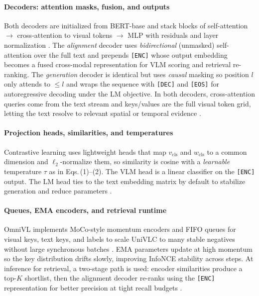 \begin{enrichment}
\begin{enrichment}
        \paragraph{Decoders: attention masks, fusion, and outputs}
        Both decoders are initialized from BERT-base and stack blocks of self-attention \(\rightarrow\) cross-attention to visual tokens \(\rightarrow\) MLP with residuals and layer normalization \cite{wang2022_omnivl}. The \emph{alignment} decoder uses \emph{bidirectional} (unmasked) self-attention over the full text and prepends \texttt{[ENC]} whose output embedding becomes a fused cross-modal representation for VLM scoring and retrieval re-ranking. The \emph{generation} decoder is identical but uses \emph{causal} masking so position \(l\) only attends to \(\le l\) and wraps the sequence with \texttt{[DEC]} and \texttt{[EOS]} for autoregressive decoding under the LM objective. In both decoders, cross-attention queries come from the text stream and keys/values are the full visual token grid, letting the text resolve to relevant spatial or temporal evidence \cite{wang2022_omnivl}.
        
        \paragraph{Projection heads, similarities, and temperatures}
        Contrastive learning uses lightweight heads that map \(v_{\mathrm{cls}}\) and \(w_{\mathrm{cls}}\) to a common dimension and \(\ell_2\)-normalize them, so similarity is cosine with a \emph{learnable} temperature \(\tau\) as in Eqs.\,(1)–(2). The VLM head is a linear classifier on the \texttt{[ENC]} output. The LM head ties to the text embedding matrix by default to stabilize generation and reduce parameters \cite{wang2022_omnivl}.
        
        \paragraph{Queues, EMA encoders, and retrieval runtime}
        OmniVL implements MoCo-style momentum encoders and FIFO queues for visual keys, text keys, and labels to scale UniVLC to many stable negatives without large synchronous batches \cite{wang2022_omnivl}. EMA parameters update at high momentum so the key distribution drifts slowly, improving InfoNCE stability across steps. At inference for retrieval, a two-stage path is used: encoder similarities produce a top-\(K\) shortlist, then the alignment decoder re-ranks using the \texttt{[ENC]} representation for better precision at tight recall budgets \cite{wang2022_omnivl}.
        

\end{enrichment}
\end{enrichment}
